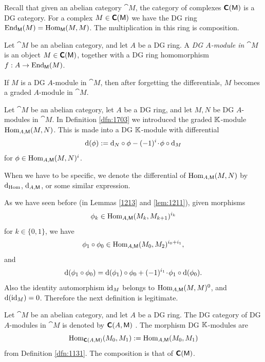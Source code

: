 Recall that given an  abelian category $\cat{M}$, the category of 
complexes $\boldsymbol{\mathsf{C}}(\operatorname{\mathsf{M}})$ is a DG category. For a complex 
$M \in \boldsymbol{\mathsf{C}}(\operatorname{\mathsf{M}})$ we have the DG ring 
$\operatorname{End}_{\operatorname{\mathsf{M}}}(M) = \operatorname{Hom}_{\operatorname{\mathsf{M}}}(M, M)$.
The multiplication in this ring is composition. 

\begin{dfn} \label{dfn:1130}
Let $\cat{M}$ be an abelian category, and let $A$ be a DG ring. A {\em DG 
$A$-module in  $\cat{M}$}
is an object 
$M \in \boldsymbol{\mathsf{C}}(\operatorname{\mathsf{M}})$, together with a DG ring homomorphism 
$f : A \to \operatorname{End}_{\operatorname{\mathsf{M}}}(M)$. 
\end{dfn}

If $M$ is a DG $A$-module in $\cat{M}$, then after forgetting the 
differentials, $M$ becomes a graded $A$-module in $\cat{M}$.

\begin{dfn} \label{dfn:1131}
Let $\cat{M}$ be an abelian category, let $A$ be a DG ring, and let $M, N$ 
be DG $A$-modules in $\cat{M}$. In Definition \ref{dfn:1703} we introduced the 
graded $\mathbb{K}$-module $\operatorname{Hom}_{A, \operatorname{\mathsf{M}}}(M, N)$. This is made into a DG 
$\mathbb{K}$-module with differential 
\[ \mathrm{d}(\phi) := \mathrm{d}_N \circ \phi - (-1)^i \mspace{1.5mu}{\cdot}\mspace{1.5mu} \phi \circ \mathrm{d}_M \]
for $\phi \in \operatorname{Hom}_{A, \operatorname{\mathsf{M}}}(M, N)^i$. 
\end{dfn}

When we have to be specific, we denote the differential of 
$\operatorname{Hom}_{A, \operatorname{\mathsf{M}}}(M, N)$ by 
$\mathrm{d}_{\mathrm{Hom}}$, $\mathrm{d}_{A, \operatorname{\mathsf{M}}}$, or some similar expression. 

As we have seen before (in Lemmas \ref{1213} and \ref{lem:1211}), given 
morphisms
\[ \phi_k \in \operatorname{Hom}_{A, \operatorname{\mathsf{M}}}(M_{k}, M_{k + 1})^{i_k} \]
for $k \in \{ 0,  1 \}$, we have  
\[ \phi_1 \circ \phi_0 \in 
\operatorname{Hom}_{A, \operatorname{\mathsf{M}}}(M_0, M_2)^{i_0 + i_1} , \]
and 
\[ \mathrm{d}(\phi_1 \circ \phi_0) = 
\mathrm{d}(\phi_1) \circ \phi_0 + (-1)^{i_1} \mspace{1.5mu}{\cdot}\mspace{1.5mu} \phi_1 \circ \mathrm{d}(\phi_0) . \]
Also the identity automorphism $\operatorname{id}_M$ belongs to 
$\operatorname{Hom}_{A, \operatorname{\mathsf{M}}}(M, M)^{0}$, and $\mathrm{d}(\operatorname{id}_M) = 0$.
Therefore the next definition is legitimate. 

\begin{dfn} \label{dfn:1213}
Let $\cat{M}$ be an abelian category, and let $A$ be a DG ring. The 
DG category of DG $A$-modules in $\cat{M}$ is 
denoted by $\boldsymbol{\mathsf{C}}(A, \operatorname{\mathsf{M}})$%
.
The morphism DG $\mathbb{K}$-modules are
\[ \operatorname{Hom}_{\boldsymbol{\mathsf{C}}(A, \operatorname{\mathsf{M}})}(M_0, M_1) :=
\operatorname{Hom}_{A, \operatorname{\mathsf{M}}}(M_0, M_1) \]
from Definition \ref{dfn:1131}.
The composition is that of $\boldsymbol{\mathsf{C}}(\operatorname{\mathsf{M}})$.
\end{dfn}

